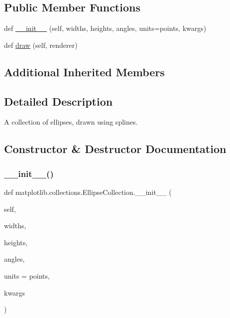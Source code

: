 \subsection*{Public Member Functions}
\begin{DoxyCompactItemize}
\item 
def \hyperlink{classmatplotlib_1_1collections_1_1EllipseCollection_abe7197a03ed00b6265612524949aebf4}{\+\_\+\+\_\+init\+\_\+\+\_\+} (self, widths, heights, angles, units=\textquotesingle{}points\textquotesingle{}, kwargs)
\item 
def \hyperlink{classmatplotlib_1_1collections_1_1EllipseCollection_a7969dac74439782e2053119819b8914d}{draw} (self, renderer)
\end{DoxyCompactItemize}
\subsection*{Additional Inherited Members}


\subsection{Detailed Description}
\begin{DoxyVerb}A collection of ellipses, drawn using splines.\end{DoxyVerb}
 

\subsection{Constructor \& Destructor Documentation}
\mbox{\label{classmatplotlib_1_1collections_1_1EllipseCollection_abe7197a03ed00b6265612524949aebf4}} 
\subsubsection{\texorpdfstring{\+\_\+\+\_\+init\+\_\+\+\_\+()}{\_\_init\_\_()}}
{\footnotesize\ttfamily def matplotlib.\+collections.\+Ellipse\+Collection.\+\_\+\+\_\+init\+\_\+\+\_\+ (\begin{DoxyParamCaption}\item[{}]{self,  }\item[{}]{widths,  }\item[{}]{heights,  }\item[{}]{angles,  }\item[{}]{units = {\ttfamily \textquotesingle{}points\textquotesingle{}},  }\item[{}]{kwargs }\end{DoxyParamCaption})}


